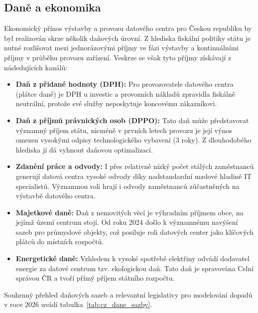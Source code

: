 \subsection{Daně a ekonomika}
\label{subsec:cz_dane}

Ekonomický přínos výstavby a provozu datového centra pro Českou republiku by byl realizován skrze několik daňových úrovní. Z hlediska fiskální politiky státu je nutné rozlišovat mezi jednorázovými příjmy ve fázi výstavby a kontinuálními příjmy v průběhu provozu zařízení. Veskrze se však tyto příjmy získávají z následujících kanálů:

\begin{itemize}

\item \textbf{Daň z přidané hodnoty (DPH):} Pro provozovatele datového centra (plátce daně) je DPH u investic a provozních nákladů zpravidla fiskálně neutrální, protože své služby neposkytuje koncovému zákazníkovi.

\item \textbf{Daň z příjmů právnických osob (DPPO):} Tato daň může představovat významný příjem státu, nicméně v prvních letech provozu je její výnos omezen vysokými odpisy technologického vybavení (3 roky). Z dlouhodobého hlediska jí dá vyhnout daňovou optimalizací.

\item \textbf{Zdanění práce a odvody:} I přes relativně nízký počet stálých zaměstnanců generují datová centra vysoké odvody díky nadstandardní mzdové hladině IT specialistů. Významnou roli hrají i odvody zaměstnanců zúčastněných na výstavbě datového centra.

\item \textbf{Majetkové daně:} Daň z nemovitých věcí je výhradním příjmem obce, na jejímž území centrum stojí. Od roku 2024 došlo k významnému navýšení sazeb pro průmyslové objekty, což posiluje roli datových center jako klíčových plátců do místních rozpočtů.

\item \textbf{Energetické daně:} Vzhledem k vysoké spotřebě elektřiny odvádí dodavatel energie za datové centrum tzv. ekologickou daň. Tato daň je spravována Celní správou ČR a tvoří přímý příjem státního rozpočtu.

\end{itemize}

Souhrnný přehled daňových sazeb a relevantní legislativy pro modelování dopadů v roce 2026 uvádí tabulka~\ref{tab:cz_dane_sazby}.


